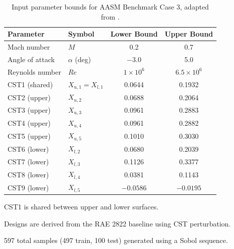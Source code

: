 \begin{table}[htbp]
  \centering
  \caption{Input parameter bounds for AASM Benchmark Case 3, adapted from \citet{bekemeyer2025}.}
  \label{tab:param_bounds}
  \begin{tabular}{llcc}
    \hline
    \textbf{Parameter} & \textbf{Symbol} & \textbf{Lower Bound} & \textbf{Upper Bound} \\
    \hline
    Mach number & $M$ & 0.2 & 0.7 \\
    Angle of attack & $\alpha$ (deg) & $-3.0$ & 5.0 \\
    Reynolds number & $Re$ & $1\times10^6$ & $6.5\times10^6$ \\
    CST1 (shared) & $X_{u,1} = X_{l,1}$ & 0.0644 & 0.1932 \\
    CST2 (upper) & $X_{u,2}$ & 0.0688 & 0.2064 \\
    CST3 (upper) & $X_{u,3}$ & 0.0961 & 0.2883 \\
    CST4 (upper) & $X_{u,4}$ & 0.0961 & 0.2882 \\
    CST5 (upper) & $X_{u,5}$ & 0.1010 & 0.3030 \\
    CST6 (lower) & $X_{l,2}$ & 0.0680 & 0.2039 \\
    CST7 (lower) & $X_{l,3}$ & 0.1126 & 0.3377 \\
    CST8 (lower) & $X_{l,4}$ & 0.0381 & 0.1143 \\
    CST9 (lower) & $X_{l,5}$ & $-0.0586$ & $-0.0195$ \\
    \hline
  \end{tabular}
  \begin{tablenotes}
    \small
    \item CST1 is shared between upper and lower surfaces.
    \item Designs are derived from the RAE 2822 baseline using CST perturbation.
    \item 597 total samples (497 train, 100 test) generated using a Sobol sequence.
  \end{tablenotes}
\end{table}
